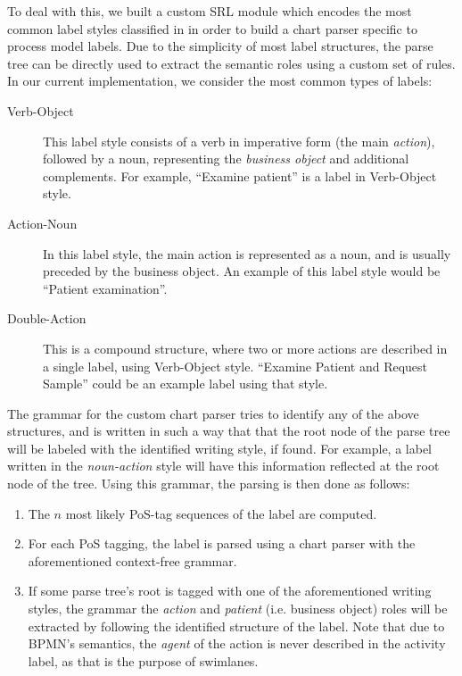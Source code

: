 To deal with this, we built a custom SRL module which encodes the most common
label styles classified in \cite{leopold2013detection} in order to
build a chart parser specific to process model labels. Due to the simplicity of
most label structures, the parse tree can be directly used to extract the
semantic roles using a custom set of rules. In our current implementation, we
consider the most common types of labels:

\begin{description}
  \item[Verb-Object]{This label style consists of a verb in imperative form (the
      main \emph{action}), followed by a noun, representing the \emph{business
        object} and additional complements. For example, ``Examine patient'' is
      a label in Verb-Object style.}
  \item[Action-Noun]{In this label style, the main action is represented as a
      noun, and is usually preceded by the business object. An example of this
      label style would be ``Patient examination''.}
  \item[Double-Action]{This is a compound structure, where two or more actions
    are described in a single label, using Verb-Object style. ``Examine Patient
    and Request Sample'' could be an example label using that style.}
\end{description}

The grammar for the custom chart parser tries to identify any of the above
structures, and is written in such a way that that the root node of the parse
tree will be labeled with the identified writing style, if found. For example, a
label written in the \emph{noun-action} style will have this information
reflected at the root node of the tree. Using this grammar, the parsing is then
done as follows:

\begin{enumerate}
  \item {The $n$ most likely PoS-tag sequences of the label are computed.}
  \item {For each PoS tagging, the label is parsed using a chart
        parser with the aforementioned context-free grammar.}
  \item {If some parse tree's root is tagged with one of the aforementioned
      writing styles, the grammar the \emph{action} and \emph{patient} (i.e.
      business object) roles will be extracted by following the identified
      structure of the label. Note that due to BPMN's semantics, the
      \emph{agent} of the action is never described in the activity label, as
      that is the purpose of swimlanes.}
    
    
\end{enumerate}

